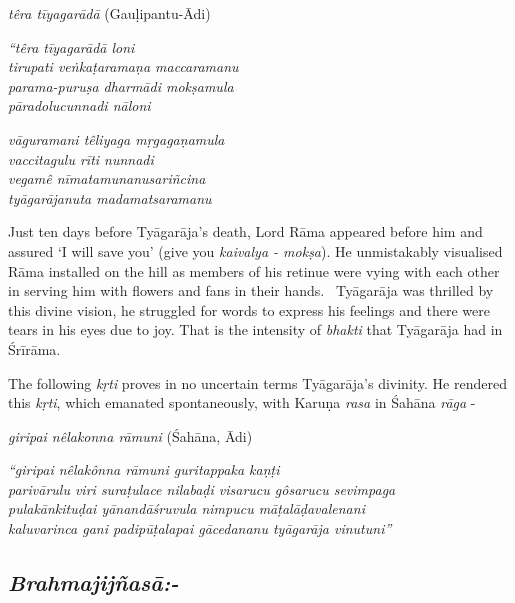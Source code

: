 \textit{têra tīyagarādā} (Gauḷipantu-Ādi)

\begin{centerquote}
\textit{“têra tīyagarādā loni}\\ \textit{tirupati veṅkaṭaramaṇa maccaramanu}\\ \textit{parama-puruṣa dharmādi mokṣamula}\\ \textit{pāradolucunnadi nāloni}
\end{centerquote}

\begin{centerquote}
\textit{vāguramani têliyaga mṛgagaṇamula}\\ \textit{vaccitagulu rīti nunnadi}\\ \textit{vegamê nīmatamunanusariñcina}\\ \textit{tyāgarājanuta madamatsaramanu}
\end{centerquote}

Just ten days before Tyāgarāja’s death, Lord Rāma appeared before him and assured ‘I will save you’ (give you \textit{kaivalya - mokṣa}). He unmistakably visualised Rāma installed on the hill as members of his retinue were vying with each other in serving him with flowers and fans in their hands.  Tyāgarāja was thrilled by this divine vision, he struggled for words to express his feelings and there were tears in his eyes due to joy. That is the intensity of \textit{bhakti} that Tyāgarāja had in Śrīrāma.

The following \textit{kṛti} proves in no uncertain terms Tyāgarāja’s divinity. He rendered this \textit{kṛti}, which emanated spontaneously, with Karuṇa \textit{rasa} in Śahāna \textit{rāga} - 

\textit{giripai nêlakonna rāmuni} (Śahāna, Ādi)

\begin{longquote}
\textit{“giripai nêlakônna rāmuni guritappaka kaṇṭi} \\ \textit{parivārulu viri suraṭulace nilabaḍi visarucu gôsarucu sevimpaga}\\ \textit{pulakānkituḍai yānandāśruvula nimpucu māṭalāḍavalenani}\\ \textit{kaluvarinca gani padipūṭalapai gācedananu tyāgarāja vinutuni”}
\end{longquote}


\subsection*{\textit{Brahmajijñasā:-}}

